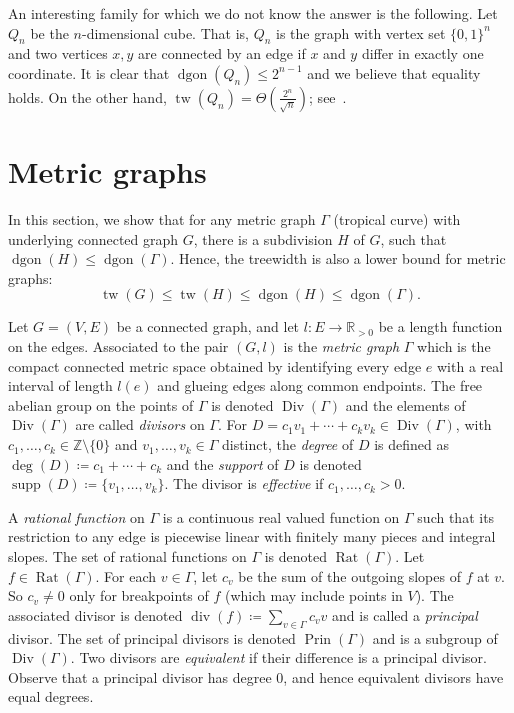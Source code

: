 \documentclass[ALCO,ThmDefs,Unicode,epreuves]{cedram}
\newcommand{\Z}{\ensuremath{\mathbb{Z}}}
\newcommand{\R}{\ensuremath{\mathbb{R}}}
\DeclareMathOperator{\tw}{tw}
\DeclareMathOperator{\Div}{Div}
\DeclareMathOperator{\Rat}{Rat}
\DeclareMathOperator{\Prin}{Prin}
\DeclareMathOperator{\todiv}{div}
\DeclareMathOperator{\dgon}{dgon}
\DeclareMathOperator{\supp}{supp}
\begin{document}
An interesting family for which we do not know the answer is the following. Let $Q_n$ be the $n$-dimensional cube. That is, $Q_n$ is the graph with vertex set $\{0,1\}^n$ and two vertices $x,y$ are connected by an edge if $x$ and $y$ differ in exactly one coordinate. It is clear that $\dgon(Q_n)\leq 2^{n-1}$ and we believe that equality holds. On the other hand, $\tw(Q_n)=\Theta(\frac{2^n}{\sqrt{n}})$; see~\cite{SunilKavitha2006}.






\section{Metric graphs}
In this section, we show that for any metric graph $\Gamma$ (tropical curve) with underlying connected graph $G$, there is a subdivision $H$ of $G$, such that $\dgon(H)\leq \dgon(\Gamma)$. Hence, the treewidth is also a lower bound for metric graphs: 
\begin{equation}\tw(G)\leq \tw(H)\leq \dgon(H)\leq \dgon(\Gamma).\end{equation}

Let $G=(V,E)$ be a connected graph, and let $l:E\to \R_{>0}$ be a length function on the edges. Associated to the pair $(G,l)$ is the \emph{metric graph} $\Gamma$ which is the compact connected metric space obtained by identifying every edge $e$ with a real interval of length $l(e)$ and glueing edges along common endpoints. The free abelian group on the points of $\Gamma$ is denoted $\Div(\Gamma)$ and the elements of $\Div(\Gamma)$ are called \emph{divisors} on $\Gamma$. For $D=c_1v_1+\cdots+c_kv_k\in \Div(\Gamma)$, with $c_1,\ldots, c_k\in \Z\setminus\{0\}$ and $v_1,\ldots, v_k\in \Gamma$ distinct, the \emph{degree} of $D$ is defined as $\deg(D)\coloneqq c_1+\cdots+c_k$ and the \emph{support} of $D$ is denoted $\supp (D)\coloneqq \{v_1,\ldots, v_k\}$. The divisor is \emph{effective} if $c_1,\ldots, c_k>0$. 

A \emph{rational function} on $\Gamma$ is a continuous real valued function on $\Gamma$ such that its restriction to any edge is piecewise linear with finitely many pieces and integral slopes. The set of rational functions on $\Gamma$ is denoted $\Rat(\Gamma)$. Let $f\in \Rat(\Gamma)$. For each $v\in \Gamma$, let $c_v$ be the sum of the outgoing slopes of $f$ at $v$. So $c_v\neq 0$ only for breakpoints of $f$ (which may include points in $V$). The associated divisor is denoted $\todiv(f)\coloneqq \sum_{v\in \Gamma} c_vv$ and is called a \emph{principal} divisor. The set of principal divisors is denoted $\Prin(\Gamma)$ and is a subgroup of $\Div(\Gamma)$. Two divisors are \emph{equivalent} if their difference is a principal divisor. Observe that a principal divisor has degree $0$, and hence equivalent divisors have equal degrees.
\end{document}
